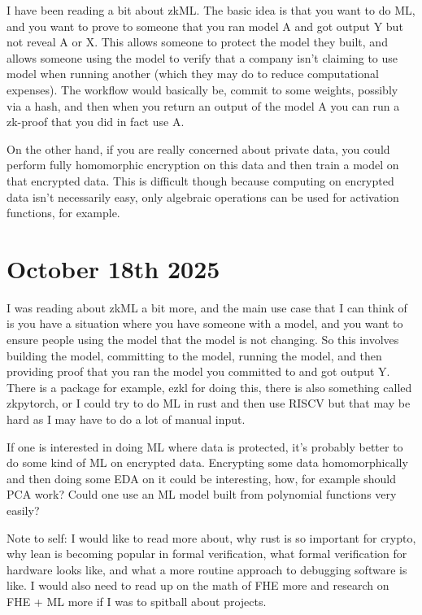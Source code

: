 \documentclass{amsart}
\theoremstyle{definition}
\begin{document}
I have been reading a bit about zkML. The basic idea is that you want to do ML, and you want to prove to someone that you ran model A and got output Y but not reveal A or X. This allows someone to protect the model they built, and allows someone using the model to verify that a company isn't claiming to use model when running another (which they may do to reduce computational expenses). The workflow would basically be, commit to some weights, possibly via a hash, and then when you return an output of the model A you can run a zk-proof that you did in fact use A.

On the other hand, if you are really concerned about private data, you could perform fully homomorphic encryption on this data and then train a model on that encrypted data. This is difficult though because computing on encrypted data isn't necessarily easy, only algebraic operations can be used for activation functions, for example.

\section{October 18th 2025}

I was reading about zkML a bit more, and the main use case that I can think of is you have a situation where you have someone with a model, and you want to ensure people using the model that the model is not changing. So this involves building the model, committing to the model, running the model, and then providing proof that you ran the model you committed to and got output Y. There is a package for example, ezkl for doing this, there is also something called zkpytorch, or I could try to do ML in rust and then use RISCV but that may be hard as I may have to do a lot of manual input.

If one is interested in doing ML where data is protected, it's probably better to do some kind of ML on encrypted data. Encrypting some data homomorphically and then doing some EDA on it could be interesting, how, for example should PCA work? Could one use an ML model built from polynomial functions very easily?

Note to self: I would like to read more about, why rust is so important for crypto, why lean is becoming popular in formal verification, what formal verification for hardware looks like, and what a more routine approach to debugging software is like. I would also need to read up on the math of FHE more and research on FHE + ML more if I was to spitball about projects.
\end{document}
